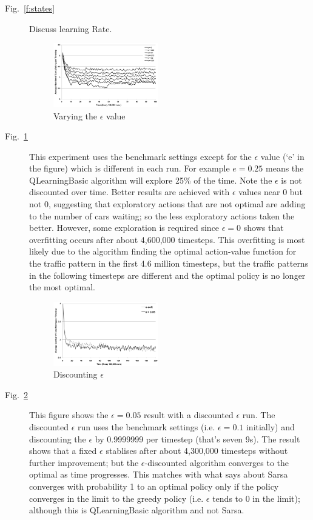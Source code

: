 \begin{description}
\item[Fig.~\ref{f:states}]
Discuss learning Rate.

\begin{figure}
\centering
\includegraphics[width=0.45\textwidth]{epsilon}
\caption{Varying the $\epsilon $ value}\label{f:epsilon}
\end{figure}

\item[Fig.~\ref{f:epsilon}]
This experiment uses the benchmark settings except for the $\epsilon$
value (`e' in the figure) which is different in each run. For example $e = 0.25$ means
the QLearningBasic algorithm will explore 25\% of the time.
Note the $\epsilon$ is not discounted over time.
Better results are achieved with $\epsilon$ values near 0 but not 0,
suggesting that exploratory actions
that are not optimal are adding to the number of cars waiting; so
the less exploratory actions taken the better. However, some exploration
is required since $\epsilon =0$ shows that overfitting occurs after
about 4,600,000 timesteps. This overfitting is most likely due to
the algorithm finding the optimal action-value function for the traffic
pattern in the first 4.6 million timesteps, but the traffic patterns
in the following timesteps are different and the optimal policy is
no longer the most optimal.

\begin{figure}
\centering
\includegraphics[width=0.45\textwidth]{e-soft}
\caption{Discounting $\epsilon$}\label{f:e-soft}
\end{figure}

\item[Fig.~\ref{f:e-soft}]
This figure shows the $\epsilon = 0.05$ result with a discounted
$\epsilon$ run. The discounted $\epsilon$ run uses the benchmark
settings (i.e. $\epsilon = 0.1$ initially) and discounting the
$\epsilon$ by 0.9999999 per timestep (that's seven 9s). The result shows
that a fixed $\epsilon$ stablises after about 4,300,000 timesteps
without further improvement; but the $\epsilon$-discounted algorithm
converges to the optimal as time progresses. This matches with what
\cite{Sutton_1998} says about Sarsa converges with probability
1 to an optimal policy only if the policy converges in the
limit to the greedy policy (i.e. $\epsilon$ tends to 0 in the limit);
although this is QLearningBasic algorithm and not Sarsa.


\end{description}
